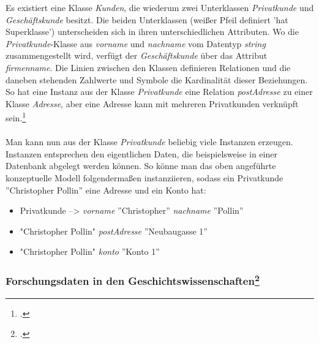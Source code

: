 \documentclass[12pt,a4paper]{article}
\begin{document}
Es existiert eine Klasse \textit{Kunden}, die wiederum zwei Unterklassen \textit{Privatkunde} und \textit{Geschäftskunde} besitzt. Die beiden Unterklassen (weißer Pfeil definiert 'hat Superklasse') unterscheiden sich in ihren unterschiedlichen Attributen. Wo die \textit{Privatkunde}-Klasse aus \textit{vorname} und \textit{nachname} vom Datentyp \textit{string} zusammengestellt wird, verfügt der \textit{Geschäftskunde} über das Attribut \textit{firmenname}. Die Linien zwischen den Klassen definieren Relationen und die daneben stehenden Zahlwerte und Symbole die Kardinalität dieser Beziehungen. So hat eine Instanz aus der Klasse \textit{Privatkunde} eine Relation \textit{postAdresse} zu einer Klasse \textit{Adresse}, aber eine Adresse kann mit mehreren Privatkunden verknüpft sein.\footcite[Vgl][S.99-108]{jannidis2017digital} 
\\
\\
Man kann nun aus der Klasse \textit{Privatkunde} beliebig viele Instanzen erzeugen. Instanzen entsprechen den eigentlichen Daten, die beispielsweise in einer Datenbank abgelegt werden können. So könne man das oben angeführte konzeptuelle Modell folgendermaßen instanziieren, sodass ein Privatkunde ''Christopher Pollin'' eine Adresse und ein Konto hat: 
\begin{itemize}
    \item[] Privatkunde --> \textit{vorname} ''Christopher'' \textit{nachname} ''Pollin''
    \item[] "Christopher Pollin" \textit{postAdresse} ''Neubaugasse 1''
    \item[] "Christopher Pollin" \textit{konto} ''Konto 1''
\end{itemize}{}

\subsubsection{Forschungsdaten in den Geschichtswissenschaften\footcite[Ausführlich habe ich mich mit den theoretischen Grundlagen der Informationswissenschaft, Daten - Information - Wissen, in folgender Arbeit auseinander gesetzt:][]{pollin2017suchen}}
\label{forschungdaten}
\end{document}
